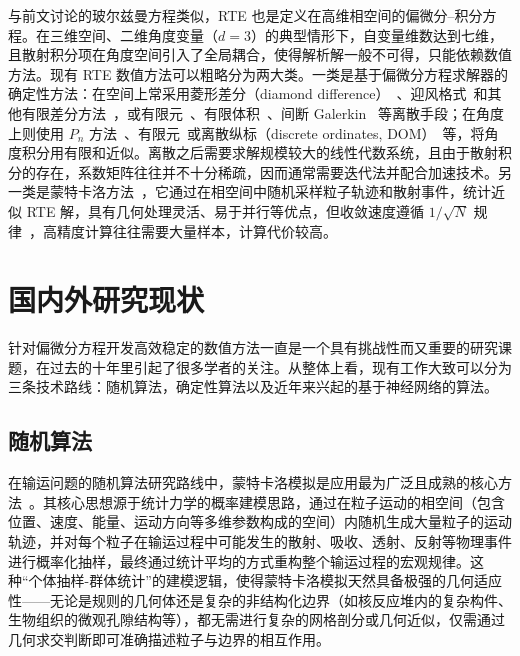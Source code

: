 与前文讨论的玻尔兹曼方程类似，RTE 也是定义在高维相空间的偏微分–积分方程。在三维空间、二维角度变量（$d=3$）的典型情形下，自变量维数达到七维，且散射积分项在角度空间引入了全局耦合，使得解析解一般不可得，只能依赖数值方法。现有 RTE 数值方法可以粗略分为两大类。一类是基于偏微分方程求解器的确定性方法：在空间上常采用菱形差分（diamond difference）~\cite{lathrop1969spatial}、迎风格式~\cite{klose2002optical}和其他有限差分方法~\cite{han2014two}，或有限元~\cite{martin1981phase,tarvainen2005coupled}、有限体积~\cite{ren2004algorithm}、间断 Galerkin ~\cite{cockburn2003discontinuous,wareing2001discontinuous,morel2005sn}等离散手段；在角度上则使用 $P_n$ 方法~\cite{case1967linear}、有限元~\cite{martin1981phase,tarvainen2005coupled}或离散纵标（discrete ordinates, DOM）~\cite{lewis1993computational,koch2004evaluation,klose2002optical}等，将角度积分用有限和近似。离散之后需要求解规模较大的线性代数系统，且由于散射积分的存在，系数矩阵往往并不十分稀疏，因而通常需要迭代法并配合加速技术。另一类是蒙特卡洛方法~\cite{lux2018monte, wang1995mcml, jacques1995monte, rubinstein2016simulation, metropolis1949monte, mackay1998introduction}，它通过在相空间中随机采样粒子轨迹和散射事件，统计近似 RTE 解，具有几何处理灵活、易于并行等优点，但收敛速度遵循 $1/\sqrt{N}$ 规律~\cite{spanier2008monte}，高精度计算往往需要大量样本，计算代价较高。

\section{国内外研究现状}

针对偏微分方程开发高效稳定的数值方法一直是一个具有挑战性而又重要的研究课题，在过去的十年里引起了很多学者的关注。从整体上看，现有工作大致可以分为三条技术路线：随机算法，确定性算法以及近年来兴起的基于神经网络的算法。

\subsection{随机算法}

在输运问题的随机算法研究路线中，蒙特卡洛模拟是应用最为广泛且成熟的核心方法~\cite{lux2018monte, }。其核心思想源于统计力学的概率建模思路，通过在粒子运动的相空间（包含位置、速度、能量、运动方向等多维参数构成的空间）内随机生成大量粒子的运动轨迹，并对每个粒子在输运过程中可能发生的散射、吸收、透射、反射等物理事件进行概率化抽样，最终通过统计平均的方式重构整个输运过程的宏观规律。这种“个体抽样-群体统计”的建模逻辑，使得蒙特卡洛模拟天然具备极强的几何适应性——无论是规则的几何体还是复杂的非结构化边界（如核反应堆内的复杂构件、生物组织的微观孔隙结构等），都无需进行复杂的网格剖分或几何近似，仅需通过几何求交判断即可准确描述粒子与边界的相互作用。


